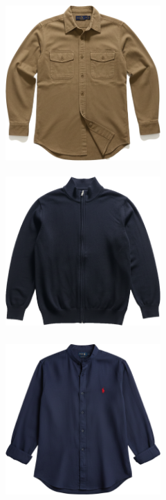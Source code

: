 \documentclass[10pt]{article}
\begin{document}
\vspace*{6.00mm}\
\begin{minipage}[c][59.33mm][c]{59.33mm}\centering
\includegraphics[width=59.33mm,height=59.33mm,keepaspectratio]{assets/midlayer/military-green-armani-button-up.png}\
\end{minipage} \hspace*{6.00mm} \begin{minipage}[c][59.33mm][c]{59.33mm}\centering
\includegraphics[width=59.33mm,height=59.33mm,keepaspectratio]{assets/midlayer/blue-navy-full-zip.png}\
\end{minipage} \hspace*{6.00mm} \begin{minipage}[c][59.33mm][c]{59.33mm}\centering
\includegraphics[width=59.33mm,height=59.33mm,keepaspectratio]{assets/midlayer/button-up-navy.png}\
\end{minipage}\
\end{document}

